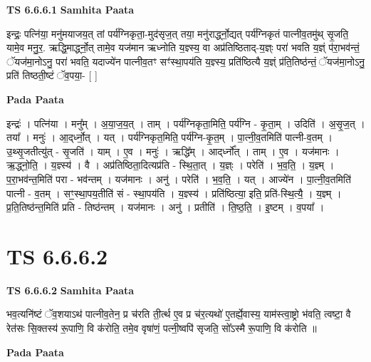 \documentclass[17pt]{extarticle}
\begin{document}
\textbf{TS 6.6.6.1 } \newline
\textbf{Samhita Paata} \newline

इन्द्रः॒ पत्नि॑या॒ मनु॑मयाजय॒त् तां पर्य॑ग्निकृता॒-मुद॑सृज॒त् तया॒ मनु॑रार्द्ध्नो॒द्यत् पर्य॑ग्निकृतं पात्नीव॒तमु॑थ् सृ॒जति॒ यामे॒व मनु॒र॒. ऋद्धि॒मार्द्ध्नो॒त् तामे॒व यज॑मान ऋध्नोति य॒ज्ञ्स्य॒ वा अप्र॑तिष्ठिताद्-य॒ज्ञ्ः परा॑ भवति य॒ज्ञ्ं प॑रा॒भव॑न्तं॒ ॅयज॑मा॒नोऽनु॒ परा॑ भवति॒ यदाज्ये॑न पात्नीव॒तꣳ सꣳ॑स्था॒पय॑ति य॒ज्ञ्स्य॒ प्रति॑ष्ठित्यै य॒ज्ञ्ं प्र॑ति॒तिष्ठ॑न्तं॒ ॅयज॑मा॒नोऽनु॒ प्रति॑ तिष्ठती॒ष्टं ॅव॒पया॒- [  ] \newline

\textbf{Pada Paata} \newline

इन्द्रः॑ । पत्नि॑या । मनु᳚म् । अ॒या॒ज॒य॒त् । ताम् । पर्य॑ग्निकृता॒मिति॒ पर्य॑ग्नि - कृ॒ता॒म् । उदिति॑ । अ॒सृ॒ज॒त् । तया᳚ । मनुः॑ । आ॒द्‌र्ध्नो॒त् । यत् । पर्य॑ग्निकृत॒मिति॒ पर्य॑ग्नि-कृ॒त॒म् । पा॒त्नी॒व॒तमिति॑ पात्नी-व॒तम् । उ॒थ्सृ॒जतीत्यु॑त् - सृ॒जति॑ । याम् । ए॒व । मनुः॑ । ऋद्धि᳚म् । आद्‌र्ध्नो᳚त् । ताम् । ए॒व । यज॑मानः । ऋ॒द्ध्नो॒ति॒ । य॒ज्ञ्स्य॑ । वै । अप्र॑तिष्ठिता॒दित्यप्र॑ति - स्थि॒ता॒त् । य॒ज्ञ्ः । परेति॑ । भ॒व॒ति॒ । य॒ज्ञ्म् । प॒रा॒भव॑न्त॒मिति॑ परा - भव॑न्तम् । यज॑मानः । अनु॑ । परेति॑ । भ॒व॒ति॒ । यत् । आज्ये॑न । पा॒त्नी॒व॒तमिति॑ पात्नी - व॒तम् । सꣳ॒॒स्था॒पय॒तीति॑ सं - स्था॒पय॑ति । य॒ज्ञ्स्य॑ । प्रति॑ष्ठित्या॒ इति॒ प्रति॑-स्थि॒त्यै॒ । य॒ज्ञ्म् । प्र॒ति॒तिष्ठ॑न्त॒मिति॑ प्रति - तिष्ठ॑न्तम् । यज॑मानः । अनु॑ । प्रतीति॑ । ति॒ष्ठ॒ति॒ । इ॒ष्टम् । व॒पया᳚ ।  \newline




\section*{ TS 6.6.6.2 }

\textbf{TS 6.6.6.2 } \newline
\textbf{Samhita Paata} \newline

भव॒त्यनि॑ष्टं ॅव॒शयाऽथ॑ पात्नीव॒तेन॒ प्र च॑रति ती॒र्त्थ ए॒व प्र च॑र॒त्यथो॑ ए॒तर्ह्ये॒वास्य॒ याम॑स्त्वा॒ष्ट्रो भ॑वति॒ त्वष्टा॒ वै रेत॑सः सि॒क्तस्य॑ रू॒पाणि॒ वि क॑रोति॒ तमे॒व वृषा॑णं॒ पत्नी॒ष्वपि॑ सृजति॒ सो᳚ऽस्मै रू॒पाणि॒ वि क॑रोति ॥ \newline

\textbf{Pada Paata} \newline
\end{document}
